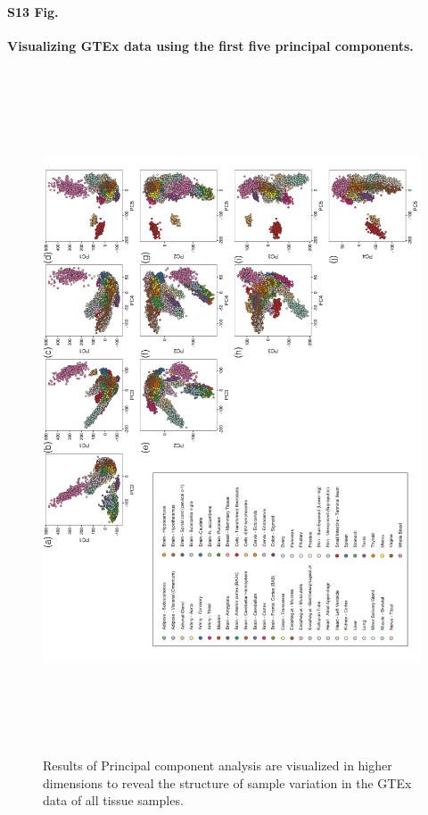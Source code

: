 \documentclass[10pt,letterpaper]{article}
\begin{document}
\paragraph*{S13 Fig.}

\label{figS13}
{\bf Visualizing GTEx data using the first five principal components.}
\begin{figure}[ht]
\centering
\includegraphics[height=8in, width=6in]{../../src/figure/gtex-high-pcs.Rmd/gtex-high-pcs.jpeg}
\caption{Results of Principal component analysis are visualized in higher dimensions to reveal the structure of sample variation in the GTEx data of all tissue samples.}
\end{figure}
\end{document}
